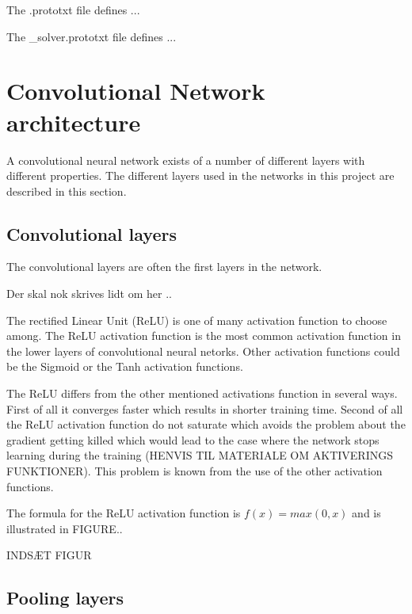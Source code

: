 The .prototxt file defines ...

The \_solver.prototxt file defines ...



\section{Convolutional Network architecture} %
\label{sec:convolutional_network_architecture}

A convolutional neural network exists of a number of different layers with different properties. The different layers used in the networks in this project are described in this section. 

\subsection{Convolutional layers} %
\label{sub:conv_layers}

The convolutional layers are often the first layers in the network.

Der skal nok skrives lidt om her ..

The rectified Linear Unit (ReLU) is one of many activation function to choose among. The ReLU activation function is the most common activation function in the lower layers of convolutional neural netorks. Other activation functions could be the Sigmoid or the Tanh activation functions.

The ReLU differs from the other mentioned activations function in several ways. First of all it converges faster which results in shorter training time. Second of all the ReLU activation function do not saturate which avoids the problem about the gradient getting killed which would lead to the case where the network stops learning during the training (HENVIS TIL MATERIALE OM AKTIVERINGS FUNKTIONER). This problem is known from the use of the other activation functions. 

The formula for the ReLU activation function is $f(x)=max(0,x)$ and is illustrated in FIGURE..

INDSÆT FIGUR


\subsection{Pooling layers} %
\label{sub:pool_layers}


